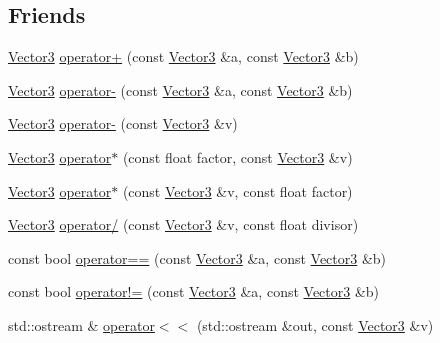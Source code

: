 \subsection*{Friends}
\begin{DoxyCompactItemize}
\item 
\hyperlink{classprism_1_1_vector3}{Vector3} \hyperlink{classprism_1_1_vector3_a2f3fba6fd08b1a9ee79193581edead97}{operator+} (const \hyperlink{classprism_1_1_vector3}{Vector3} \&a, const \hyperlink{classprism_1_1_vector3}{Vector3} \&b)
\item 
\hyperlink{classprism_1_1_vector3}{Vector3} \hyperlink{classprism_1_1_vector3_a4f0726718533ef9da9956faccc4eb5b5}{operator-\/} (const \hyperlink{classprism_1_1_vector3}{Vector3} \&a, const \hyperlink{classprism_1_1_vector3}{Vector3} \&b)
\item 
\hyperlink{classprism_1_1_vector3}{Vector3} \hyperlink{classprism_1_1_vector3_a0b83b76136fcd64d3d12f50db5db223f}{operator-\/} (const \hyperlink{classprism_1_1_vector3}{Vector3} \&v)
\item 
\hyperlink{classprism_1_1_vector3}{Vector3} \hyperlink{classprism_1_1_vector3_abc31e90d1677fde0ca1ff3e23daae851}{operator$\ast$} (const float factor, const \hyperlink{classprism_1_1_vector3}{Vector3} \&v)
\item 
\hyperlink{classprism_1_1_vector3}{Vector3} \hyperlink{classprism_1_1_vector3_ae7fd15d5dffc5c611e611998321df833}{operator$\ast$} (const \hyperlink{classprism_1_1_vector3}{Vector3} \&v, const float factor)
\item 
\hyperlink{classprism_1_1_vector3}{Vector3} \hyperlink{classprism_1_1_vector3_a9f4ae4eea6c149a0cd72a692d737327d}{operator/} (const \hyperlink{classprism_1_1_vector3}{Vector3} \&v, const float divisor)
\item 
const bool \hyperlink{classprism_1_1_vector3_a71b0a5a5af557f64264c6e48949a8435}{operator==} (const \hyperlink{classprism_1_1_vector3}{Vector3} \&a, const \hyperlink{classprism_1_1_vector3}{Vector3} \&b)
\item 
const bool \hyperlink{classprism_1_1_vector3_ace6e7ad2bf23c3246652c9b115b8e7fc}{operator!=} (const \hyperlink{classprism_1_1_vector3}{Vector3} \&a, const \hyperlink{classprism_1_1_vector3}{Vector3} \&b)
\item 
std\+::ostream \& \hyperlink{classprism_1_1_vector3_a6b8025c0424ba8db565d3153d8dc9c0e}{operator$<$$<$} (std\+::ostream \&out, const \hyperlink{classprism_1_1_vector3}{Vector3} \&v)
\end{DoxyCompactItemize}


